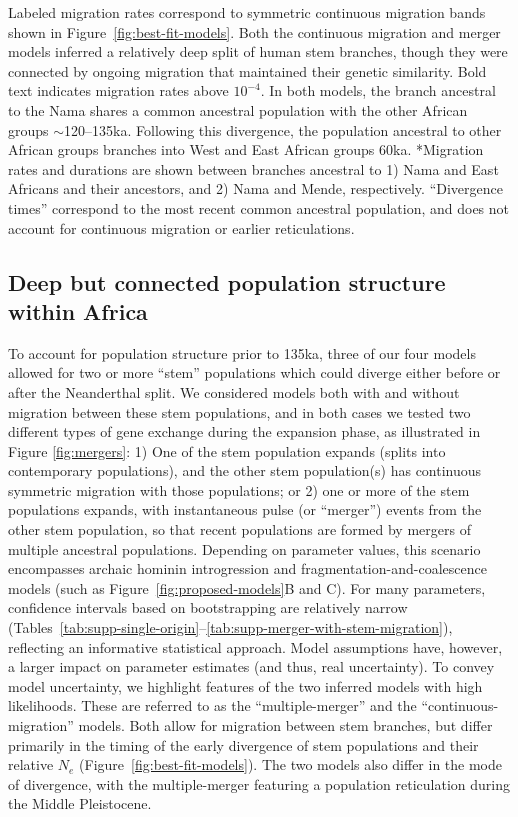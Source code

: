 \documentclass[]{article}
\begin{document}
\begin{table}[t!]
{        Labeled migration rates correspond to symmetric continuous migration
        bands shown in Figure~\ref{fig:best-fit-models}. Both the continuous migration and
        merger models inferred a relatively deep split of human stem branches,
        though they were connected by ongoing migration that maintained their
        genetic similarity. Bold text indicates migration rates above $10^{-4}$.
        In both models, the branch ancestral to the Nama shares a common ancestral population
        with the other African groups $\sim$120--135ka. Following this divergence,
        the population ancestral to other African groups branches into West and East African
        groups 60ka.
        *Migration rates and durations are shown between branches ancestral to 
        1) Nama and East Africans and their ancestors, and
        2) Nama and Mende, respectively.
        ``Divergence times'' correspond to the most recent common ancestral population,
        and does not account for continuous migration or earlier reticulations.
    }
    \label{tab:migration-rates}
\end{table}

\subsection*{Deep but connected population structure within Africa}

To account for population structure prior to 135ka, three of our four models
allowed for two or more ``stem'' populations which could diverge either before
or after the Neanderthal split. We considered models both with and without
migration between these stem populations, and in both cases we tested two
different types of gene exchange during the expansion phase, as illustrated in
Figure \ref{fig:mergers}: 1) One of the stem population expands (splits into
contemporary populations), and the other stem population(s) has continuous
symmetric migration with those populations; or 2) one or more of the stem
populations expands, with instantaneous pulse (or ``merger'') events from the
other stem population, so that recent populations are formed by mergers of
multiple ancestral populations. Depending on parameter values, this scenario
encompasses archaic hominin introgression and fragmentation-and-coalescence
models (such as Figure~\ref{fig:proposed-models}B and C).  For many parameters,
confidence intervals based on bootstrapping are relatively narrow
(Tables~\ref{tab:supp-single-origin}--\ref{tab:supp-merger-with-stem-migration}),
reflecting an informative statistical approach. Model assumptions have,
however, a larger impact on parameter estimates (and thus, real uncertainty).
To convey model uncertainty, we highlight features of the two inferred models
with high likelihoods. These are referred to as the ``multiple-merger'' and the
``continuous-migration'' models. Both allow for migration between stem
branches, but differ primarily in the timing of the early divergence of stem
populations and their relative $N_e$ (Figure~\ref{fig:best-fit-models}). The
two models also differ in the mode of divergence, with the multiple-merger
featuring a population reticulation during the Middle Pleistocene.
\end{document}
